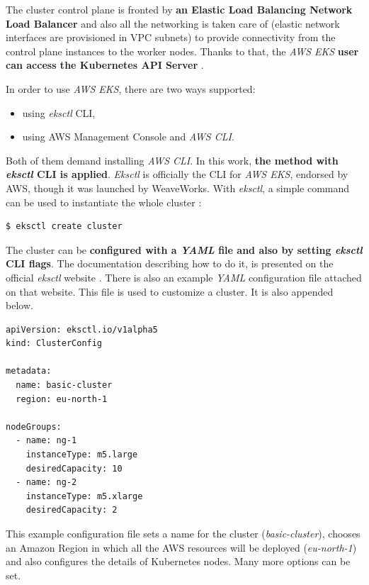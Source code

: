 The cluster control plane is fronted by \textbf{an Elastic Load Balancing Network Load Balancer} and also all the networking is taken care of (elastic network interfaces are provisioned in VPC subnets) to provide connectivity from the control plane instances to the worker nodes. Thanks to that, the \textit{AWS EKS} \textbf{user can access the Kubernetes API Server} \cite{eks-clusters}.

In order to use \textit{AWS EKS}, there are two ways supported:
\begin{itemize}
\item using \textit{eksctl} CLI,
\item using AWS Management Console and \textit{AWS CLI}.
\end{itemize}

Both of them demand installing \textit{AWS CLI}. In this work, \textbf{the method with \textit{eksctl} CLI is applied}. \textit{Eksctl} is officially the CLI for \textit{AWS EKS}, endorsed by AWS, though it was launched by WeaveWorks. With \textit{eksctl}, a simple command can be used to instantiate the whole cluster \cite{eks-cli-official}:
\begin{lstlisting}[basicstyle=\small,caption={A command of \textit{eksctl} CLI tool used to create a Kubernetes cluster},captionpos=b,language=Bash,xleftmargin=1cm]
$ eksctl create cluster
\end{lstlisting}

The cluster can be \textbf{configured with a \textit{YAML} file and also by setting \textit{eksctl} CLI flags}. The documentation describing how to do it, is presented on the official \textit{eksctl} website \cite{eksctl}. There is also an example \textit{YAML} configuration file attached on that website. This file is used to customize a cluster. It is also appended below.

\begin{lstlisting}[basicstyle=\small,caption={An example \textit{YAML} file used to customize a Kubernetes cluster created with \textit{eksctl} CLI tool \cite{eksctl}},captionpos=b,language=Bash,xleftmargin=1cm]
apiVersion: eksctl.io/v1alpha5
kind: ClusterConfig

metadata:
  name: basic-cluster
  region: eu-north-1

nodeGroups:
  - name: ng-1
    instanceType: m5.large
    desiredCapacity: 10
  - name: ng-2
    instanceType: m5.xlarge
    desiredCapacity: 2
\end{lstlisting}

This example configuration file sets a name for the cluster (\textit{basic-cluster}), chooses an Amazon Region in which all the AWS resources will be deployed (\textit{eu-north-1}) and also configures the details of Kubernetes nodes. Many more options can be set.


